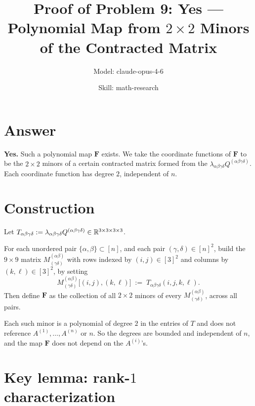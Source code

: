 

\title{Proof of Problem 9: Yes --- Polynomial Map from $2\times 2$ Minors of the Contracted Matrix}
\author{Model: claude-opus-4-6 \and Skill: math-research}
\date{}

\newtheorem{theorem}{Theorem}
\newtheorem{lemma}[theorem]{Lemma}
\newtheorem{proposition}[theorem]{Proposition}


\maketitle

\section*{Answer}

\textbf{Yes.} Such a polynomial map $\mathbf F$ exists. We take the coordinate functions of $\mathbf F$ to be the $2\times 2$ minors of a certain contracted matrix formed from the $\lambda_{\alpha\beta\gamma\delta} Q^{(\alpha\beta\gamma\delta)}$. Each coordinate function has degree $2$, independent of $n$.

\section{Construction}

Let $T_{\alpha\beta\gamma\delta}:=\lambda_{\alpha\beta\gamma\delta} Q^{(\alpha\beta\gamma\delta)}\in\mathbb{R}^{3\times 3\times 3\times 3}$.

For each unordered pair $\{\alpha,\beta\}\subset[n]$, and each pair $(\gamma,\delta)\in[n]^2$, build the $9\times 9$ matrix $M^{(\alpha\beta)}_{(\gamma\delta)}$ with rows indexed by $(i,j)\in[3]^2$ and columns by $(k,\ell)\in[3]^2$, by setting
\[
   M^{(\alpha\beta)}_{(\gamma\delta)}\bigl[(i,j),(k,\ell)\bigr] \;:=\; T_{\alpha\beta\gamma\delta}(i,j,k,\ell).
\]
Then define $\mathbf F$ as the collection of all $2\times 2$ minors of every $M^{(\alpha\beta)}_{(\gamma\delta)}$, across all pairs.

Each such minor is a polynomial of degree $2$ in the entries of $T$ and does not reference $A^{(1)},\ldots,A^{(n)}$ or $n$. So the degrees are bounded and independent of $n$, and the map $\mathbf F$ does not depend on the $A^{(i)}$'s.

\section{Key lemma: rank-$1$ characterization}

